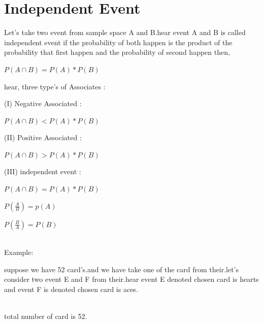 \documentclass[a4paper,12pt]{article}
\theoremstyle{definition}
\begin{document}
\section{Independent Event}
\par Let's take two event from sample space A and B.hear event A and B is called independent event  if the probability of both happen is the product of the probability that first happen and the probability of second happen then,\\
  \begin{center}
      $P(A \cap B) = P(A)*P(B) $\\
 \end{center}
\par hear, three type's of Associates :\\
\par (I) Negative Associated :\\
    \begin{center}
      $P(A \cap B) <  P(A)*P(B) $\\
     \end{center}
\par (II) Positive Associated :\\
     \begin{center}
      $P(A \cap B) >  P(A)*P(B) $\\
     \end{center}
\par (III) independent event :\\
    \begin{center}
     $P(A \cap B) =  P(A)*P(B) $\\
    \end{center}
     \begin{center}
     $P(\frac{A}{B}) = p(A) $ \\
    \end{center}
     \begin{center}
    \par $P(\frac{B}{A})= P(B) $\\
    \end{center}
\vskip 0.25cm\\
Example:
\par suppose we have 52 card's.and we have take one of the card from their.let's consider two event E and F from their.hear event E denoted chosen card is hearts
and event F is denoted chosen card is aces.\\
\vskip 0.5cm\\
\par  total number of card is 52.\\
\end{document}
